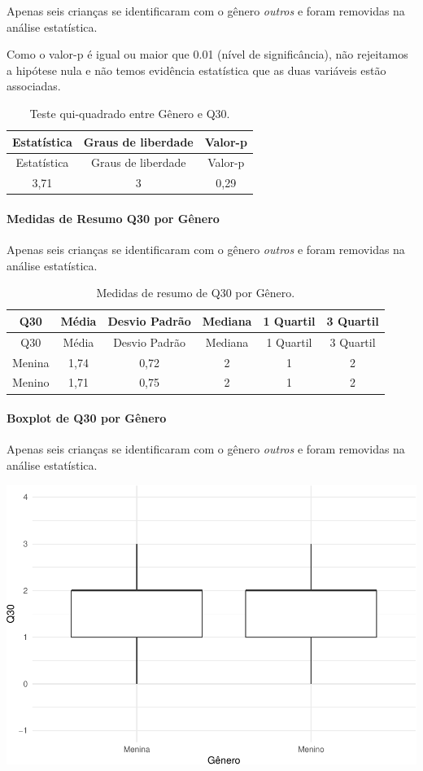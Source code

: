 \documentclass[]{article}
\let\oldparagraph\paragraph
\renewcommand{\paragraph}[1]{\oldparagraph{#1}\mbox{}}
\begin{document}
Apenas seis crianças se identificaram com o gênero \emph{outros} e foram removidas na análise estatística.

Como o valor-p é igual ou maior que 0.01 (nível de significância), não rejeitamos a hipótese nula e não temos evidência estatística que as duas variáveis estão associadas.

\begin{longtable}[]{@{}ccc@{}}
\caption{\label{tab:unnamed-chunk-970}Teste qui-quadrado entre Gênero e Q30.}\tabularnewline
\toprule
Estatística & Graus de liberdade & Valor-p\tabularnewline
\midrule
\endfirsthead
\toprule
Estatística & Graus de liberdade & Valor-p\tabularnewline
\midrule
\endhead
3,71 & 3 & 0,29\tabularnewline
\bottomrule
\end{longtable}

\cleardoublepage

\hypertarget{medidas-de-resumo-q30-por-guxeanero}{%
\paragraph{Medidas de Resumo Q30 por Gênero}\label{medidas-de-resumo-q30-por-guxeanero}}

Apenas seis crianças se identificaram com o gênero \emph{outros} e foram removidas na análise estatística.

\begin{longtable}[]{@{}cccccc@{}}
\caption{\label{tab:unnamed-chunk-971}Medidas de resumo de Q30 por Gênero.}\tabularnewline
\toprule
Q30 & Média & Desvio Padrão & Mediana & 1 Quartil & 3 Quartil\tabularnewline
\midrule
\endfirsthead
\toprule
Q30 & Média & Desvio Padrão & Mediana & 1 Quartil & 3 Quartil\tabularnewline
\midrule
\endhead
Menina & 1,74 & 0,72 & 2 & 1 & 2\tabularnewline
Menino & 1,71 & 0,75 & 2 & 1 & 2\tabularnewline
\bottomrule
\end{longtable}

\hypertarget{boxplot-de-q30-por-guxeanero}{%
\paragraph{Boxplot de Q30 por Gênero}\label{boxplot-de-q30-por-guxeanero}}

Apenas seis crianças se identificaram com o gênero \emph{outros} e foram removidas na análise estatística.

\begin{center}\includegraphics[width=0.75\linewidth]{relatorio_covid19_files/figure-latex/unnamed-chunk-972-1} \end{center}
\end{document}
